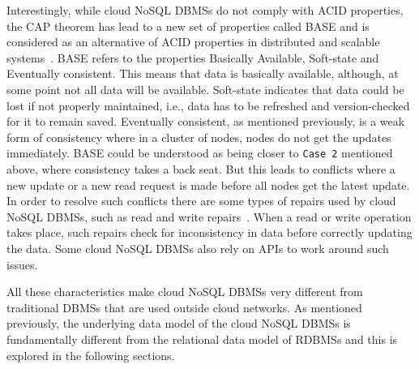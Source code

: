 Interestingly, while cloud \ac{NoSQL} \acp{DBMS} do not comply with ACID
properties,   the CAP theorem has lead to a new set of properties called BASE
and is considered as an alternative of ACID properties in distributed and
scalable systems~\citep{Pritchett}.
BASE refers to the properties Basically Available,   Soft-state and Eventually
consistent.   This means that data is basically available, although, at some
point not all data will be available. Soft-state indicates that data could be
lost if not properly maintained, i.e., data has to be refreshed and
version-checked for it to remain saved.   Eventually consistent,   as mentioned
previously,   is a weak form of consistency where in a cluster of nodes,  nodes
do not get the updates immediately.
BASE could be understood as being closer to  \texttt{Case 2} mentioned above,
where consistency takes a back seat.   But this leads to conflicts where a new
update or a new read request is made before all nodes get the latest update.
In order to resolve such conflicts there are some types of repairs used by cloud
\ac{NoSQL} \acp{DBMS}, such as read and write repairs~\citep{Terry}.  When a
read or write operation takes place,   such repairs check for inconsistency in
data before correctly updating the data.
Some cloud \ac{NoSQL} \acp{DBMS} also rely on APIs to work around such issues.

All these characteristics make cloud \ac{NoSQL} \acp{DBMS} very different from
traditional \acp{DBMS} that are used outside cloud networks.   As mentioned
previously, the underlying data model of the cloud \ac{NoSQL} \acp{DBMS} is
fundamentally different from the relational data model of \acp{RDBMS} and this
is explored in the following sections. 
